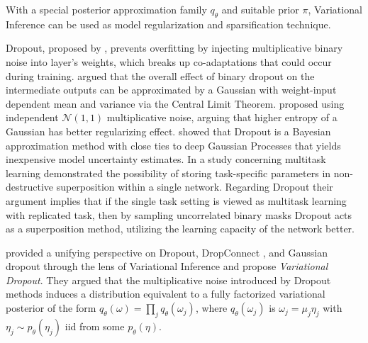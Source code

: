 \documentclass[a4paper,10pt,twocolumn]{article}
\begin{document}
With a special posterior approximation family $q_\theta$ and suitable prior $\pi$,
Variational Inference can be used as model regularization and sparsification technique.

Dropout, proposed by \citet{hinton_improving_2012}, prevents overfitting by injecting
multiplicative binary noise into layer's weights, which breaks up co-adaptations that
could occur during training. \citet{wang_fast_2013} argued that the overall effect of
binary dropout on the intermediate outputs can be approximated by a Gaussian with weight-input
dependent mean and variance via the Central Limit Theorem. \citet{srivastava_dropout:_2014}
proposed using independent $\mathcal{N}(1, 1)$ multiplicative noise, arguing that higher
entropy of a Gaussian has better regularizing effect. \citet{gal_dropout_2016} showed
that Dropout is a Bayesian approximation method with close ties to deep Gaussian Processes
that yields inexpensive model uncertainty estimates. In a study concerning multitask learning
\citet{cheung_superposition_2019} demonstrated the possibility of storing task-specific
parameters in non-destructive superposition within a single network. Regarding Dropout
their argument implies that if the single task setting is viewed as multitask learning
with replicated task, then by sampling uncorrelated binary masks Dropout acts as a
superposition method, utilizing the learning capacity of the network better.

%
\citet{kingma_variational_2015} provided a unifying perspective on Dropout, DropConnect
\citep{wan_regularization_2013}, and Gaussian dropout \citep{wang_fast_2013} through
the lens of Variational Inference and propose \emph{Variational Dropout}. They
argued that the multiplicative noise introduced by Dropout methods induces a distribution
equivalent to a fully factorized variational posterior of the form $
  q_\theta(\omega) = \prod_j q_{\theta}(\omega_j)
$, where $q_{\theta}(\omega_j)$ is $\omega_j = \mu_j \eta_j$ with $
  \eta_j \sim p_\theta(\eta_j)
$ iid from some $p_\theta(\eta)$.
%
\end{document}
